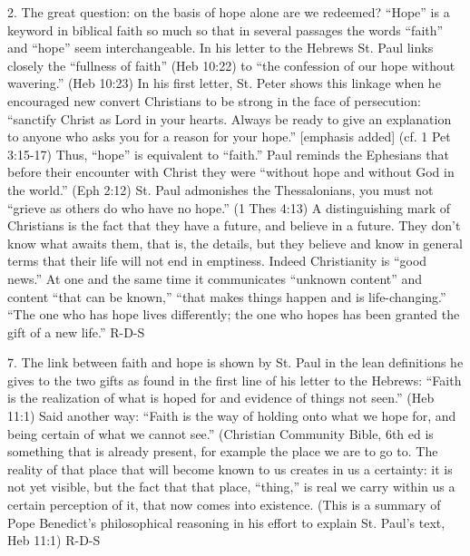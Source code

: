 \documentclass[oneside]{book}
\begin{document}
2. The great question: on the basis of hope alone are we redeemed? ``Hope'' is a
keyword in biblical faith  so much so that in several passages the words
``faith'' and ``hope'' seem interchangeable. In his letter to the Hebrews
St. Paul links closely the ``fullness of faith'' (Heb 10:22) to ``the confession
of our hope without wavering.'' (Heb 10:23) In his first letter, St. Peter shows
this linkage when he encouraged new convert Christians to be strong in the face
of persecution: ``sanctify Christ as Lord in your hearts. Always be ready to
give an explanation to anyone who asks you for a reason for your hope.''
[emphasis added] (cf. 1 Pet 3:15-17) Thus, ``hope'' is equivalent to ``faith.''
Paul reminds the Ephesians that before their encounter with Christ they were
``without hope and without God in the world.'' (Eph 2:12) St. Paul admonishes
the Thessalonians, you must not ``grieve as others do who have no hope.'' (1
Thes 4:13) A distinguishing mark of Christians is the fact that they have a
future, and believe in a future. They don't know what awaits them, that is, the
details, but they believe and know in general terms that their life will not end
in emptiness. Indeed Christianity is ``good news.'' At one and the same time it
communicates ``unknown content'' and content ``that can be known,'' ``that makes
things happen and is life-changing.'' ``The one who has hope lives differently;
the one who hopes has been granted the gift of a new life.''
R-D-S

7. The link between faith and hope is shown by St. Paul in the lean definitions
he gives to the two gifts as found in the first line of his letter to the
Hebrews: ``Faith is the realization of what is hoped for and evidence of things
not seen.'' (Heb 11:1) Said another way: ``Faith is the way of holding onto what
we hope for, and being certain of what we cannot see.'' (Christian Community
Bible, 6th ed is something that is already present, for example the place we are
to go to. The reality of that place that will become known to us creates in us a
certainty: it is not yet visible, but the fact that that place, ``thing,'' is
real we carry within us a certain perception of it, that now comes into
existence. (This is a summary of Pope Benedict's philosophical reasoning in his
effort to explain St. Paul's text, Heb 11:1)
R-D-S
\end{document}
